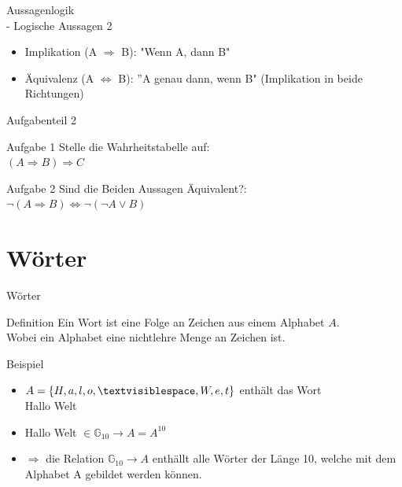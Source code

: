 \documentclass[18pt]{beamer}
\begin{document}
	\begin{frame}{Aussagenlogik\\ - Logische Aussagen 2}
		\begin{itemize}
			\item Implikation (A $\Rightarrow$ B): "Wenn A, dann B"
			\pause
			\item \"Aquivalenz (A $\Leftrightarrow$ B): ''A genau dann, wenn B" (Implikation in beide Richtungen)
		\end{itemize}
	\end{frame}


	\begin{frame}{Aufgabenteil 2}
		\begin{block}{Aufgabe 1}
			Stelle die Wahrheitstabelle auf:\\
			$(A \Rightarrow B) \Rightarrow C$
		\end{block}
		
		\begin{block}{Aufgabe 2}
			Sind die Beiden Aussagen \"Aquivalent?:\\
			$\neg (A \Rightarrow B) \Leftrightarrow \neg (\neg A \lor B)$
		\end{block}
	\end{frame}
	
	
	\section{W\"orter}
	\begin{frame} {W\"orter}
		\begin{block} {Definition}
			Ein Wort ist eine Folge an Zeichen aus einem Alphabet $A$.\\
			Wobei ein Alphabet eine nichtlehre Menge an Zeichen ist.
		\end{block}
		
		\pause
	
		\begin{exampleblock} {Beispiel}
			\begin{itemize}
				\item $A = \left\{H, a, l, o, \textvisiblespace, W, e, t\right\}$  enth\"alt das Wort\\
            Hallo Welt
            \pause
            \item Hallo Welt $\in \mathbb{G}_{10} \rightarrow A = A^{10}$
            \pause
            \item $\Rightarrow$ die Relation $\mathbb{G}_{10} \rightarrow A$ enth\"allt alle W\"orter der L\"ange 10, welche mit dem Alphabet A gebildet werden k\"onnen. 
			\end{itemize}
	
		\end{exampleblock}
	\end{frame}
	
\end{document}

